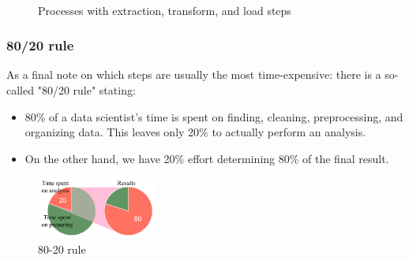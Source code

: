 \begin{figure}[H]
  \centering

  \\\vspace*{0.5cm}

  \caption{Processes with extraction, transform, and load steps}
  \label{fig:1_etl_and_elt}
\end{figure}

\subsubsection*{80/20 rule}
As a final note on which steps are usually the most time-expensive: there is a so-called "80/20 rule" stating:
\begin{itemize}
  \item 80\% of a data scientist's time is spent on finding, cleaning, preprocessing, and organizing data. This leaves only 20\% to actually perform an analysis.
  \item On the other hand, we have 20\% effort determining 80\% of the final result.
\end{itemize}

\begin{figure}[H]
  \centering
  \includegraphics[width=0.35\textwidth]{assets/basics/80_20.png}
  \caption{80-20 rule}
  \label{fig:1_80_20}
\end{figure}